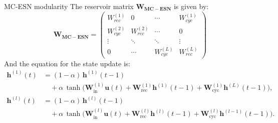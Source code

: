 \documentclass{beamer}
\begin{document}
\begin{frame}{MC-ESN modularity}
    The reservoir matrix $\mathbf{W_{MC-ESN}}$ is given by:
        \small
    \[
    \mathbf{W_{MC-ESN}} = \begin{pmatrix}
    W_{rec}^{(1)} & 0 & \cdots & W_{cyc}^{(1)} \\
    W_{cyc}^{(2)} & W_{rec}^{(2)} & \cdots & 0 \\
    \vdots & \ddots & \ddots & \vdots \\
    0 & \cdots & W_{cyc}^{(L)} & W_{rec}^{(L)}
    \end{pmatrix}
    \]
    And the equation for the state update is:
    \tiny
        \begin{equation}
    \begin{aligned}
    \mathbf{h}^{(1)}(t) &= (1-\alpha)\,\mathbf{h}^{(1)}(t-1) \\
    &\quad + \alpha\,\tanh\Big(
    \mathbf{W}_{\text{in}}^{(1)} \mathbf{u}(t)
    + \mathbf{W}_{\text{rec}}^{(1)} \mathbf{h}^{(1)}(t-1)
    + \mathbf{W}_{\text{cyc}}^{(1)} \mathbf{h}^{(L)}(t-1)
    \Big), \\[0.5em]
    \mathbf{h}^{(l)}(t) &= (1-\alpha)\,\mathbf{h}^{(l)}(t-1) \\
    &\quad + \alpha\,\tanh\Big(
    \mathbf{W}_{\text{in}}^{(l)} \mathbf{u}(t)
    + \mathbf{W}_{\text{rec}}^{(l)} \mathbf{h}^{(l)}(t-1)
    + \mathbf{W}_{\text{cyc}}^{(l)} \mathbf{h}^{(l-1)}(t-1)
    \Big).
    \end{aligned}
    \end{equation}
\end{frame}
\end{document}
